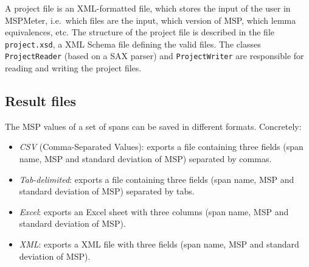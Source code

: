 \documentclass{article}
\begin{document}
A project file is an XML-formatted file, which stores the input of the user in MSPMeter, i.e.\ which files are the input, which version of MSP, which lemma equivalences, etc. The structure of the project file is described in the file \texttt{project.xsd}, a XML Schema file defining the valid files. The classes \texttt{ProjectReader} (based on a SAX parser) and \texttt{ProjectWriter} are responsible for reading and writing the project files.


\subsection{Result files}

The MSP values of a set of spans can be saved in different formats. Concretely:
\begin{itemize}
\item \emph{CSV} (Comma-Separated Values): exports a file containing three fields (span name, MSP and standard deviation of MSP) separated by commas. 

\item \emph{Tab-delimited}: exports a file containing three fields (span name, MSP and standard deviation of MSP) separated by tabs. 

\item \emph{Excel}: exports an Excel sheet with three columns (span name, MSP and standard deviation of MSP). 

\item \emph{XML}: exports a XML file with three fields (span name, MSP and standard deviation of MSP).
\end{itemize}
\end{document}
